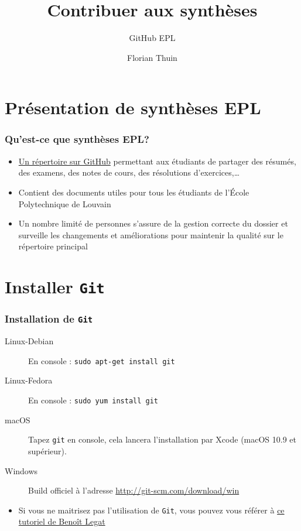 \documentclass{beamer}
\title{Contribuer aux synthèses}
\subtitle{GitHub EPL}
\author{Florian Thuin}
\institute{École Polytechnique de Louvain}
\begin{document}
\begin{frame}[plain]
	\titlepage
\end{frame}



\section{Présentation de synthèses EPL}

\begin{frame}
	\frametitle{Qu'est-ce que synthèses EPL?}
		\begin{itemize}
 			\item \href{https://github.com/Gp2mv3/Syntheses}{Un répertoire sur GitHub} permettant aux étudiants de
 			    partager des résumés, des examens, des notes de cours,
 			    des résolutions d'exercices,\ldots
 			\item Contient des documents utiles pour tous les étudiants
 			    de l'École Polytechnique de Louvain
 			\item Un nombre limité de personnes s'assure de la gestion
 			    correcte du dossier et surveille les changements et
 			    améliorations pour maintenir la qualité sur le répertoire
 			    principal
 		\end{itemize}
\end{frame}

\section{Installer \texttt{Git}}

\begin{frame}[fragile]
    \frametitle{Installation de \lstinline|Git|}
    \begin{description}
        \item[Linux-Debian] En console : \lstinline|sudo apt-get install git|
        \item[Linux-Fedora] En console : \lstinline|sudo yum install git|
        \item[macOS] Tapez \lstinline|git| en console, cela lancera
            l'installation par Xcode (macOS 10.9 et supérieur).
        \item[Windows] Build officiel à l'adresse
            \url{http://git-scm.com/download/win}
    \end{description}
    \begin{itemize}
        \item Si vous ne maitrisez pas l'utilisation de \lstinline|Git|, vous pouvez
            vous référer à
            \href{http://sites.uclouvain.be/SystInfo/notes/Outils/html/git.html}{ce
            tutoriel de Benoît Legat}
    \end{itemize}
\end{frame}
\end{document}
